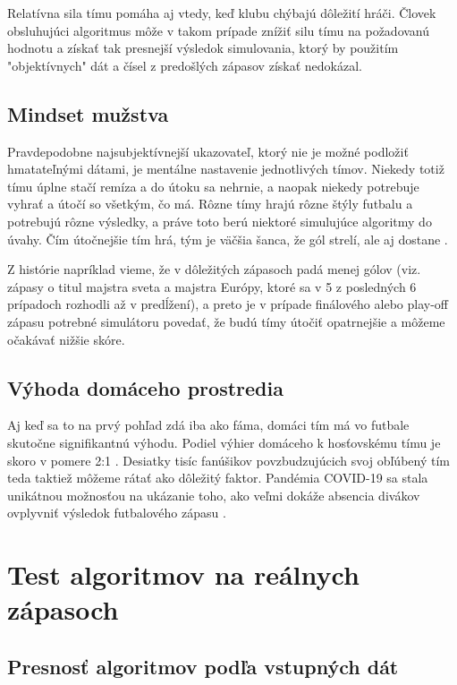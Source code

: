 \documentclass[10pt,twoside,slovak,a4paper]{article}
\begin{document}
Relatívna sila tímu pomáha aj vtedy, keď klubu chýbajú dôležití hráči. Človek obsluhujúci algoritmus môže v takom prípade znížiť silu tímu na požadovanú hodnotu a získať tak presnejší výsledok simulovania, ktorý by použitím "objektívnych" dát a čísel z predošlých zápasov získať nedokázal.

\subsection{Mindset mužstva}

Pravdepodobne najsubjektívnejší ukazovateľ, ktorý nie je možné podložiť hmatateľnými dátami, je mentálne nastavenie jednotlivých tímov. Niekedy totiž tímu úplne stačí remíza a do útoku sa nehrnie, a naopak niekedy potrebuje vyhrať a útočí so všetkým, čo má. Rôzne tímy hrajú rôzne štýly futbalu a potrebujú rôzne výsledky, a práve toto berú niektoré simulujúce algoritmy do úvahy. Čím útočnejšie tím hrá, tým je väčšia šanca, že gól strelí, ale aj dostane \cite{ferrarini2014new}.

Z histórie napríklad vieme, že v dôležitých zápasoch padá menej gólov (viz. zápasy o titul majstra sveta a majstra Európy, ktoré sa v 5 z posledných 6 prípadoch rozhodli až v predĺžení), a preto je v prípade finálového alebo play-off zápasu potrebné simulátoru povedať, že budú tímy útočiť opatrnejšie a môžeme očakávať nižšie skóre.

\subsection{Výhoda domáceho prostredia}

Aj keď sa to na prvý pohľad zdá iba ako fáma, domáci tím má vo futbale skutočne signifikantnú výhodu. Podiel výhier domáceho k hosťovskému tímu je skoro v pomere 2:1 \cite{dixon1997modelling}. Desiatky tisíc fanúšikov povzbudzujúcich svoj obľúbený tím teda taktiež môžeme rátať ako dôležitý faktor. Pandémia COVID-19 sa stala unikátnou možnosťou na ukázanie toho, ako veľmi dokáže absencia divákov ovplyvniť výsledok futbalového zápasu \cite{2020}.

\section{Test algoritmov na reálnych zápasoch}

\subsection{Presnosť algoritmov podľa vstupných dát}
\end{document}

